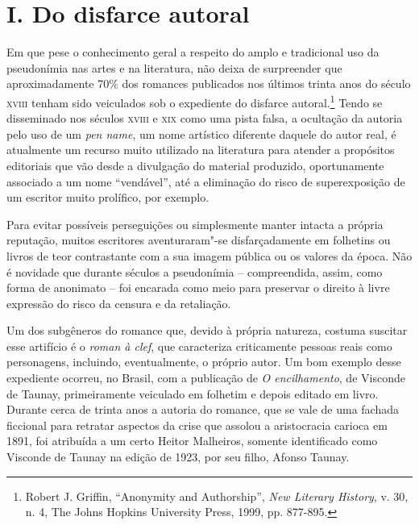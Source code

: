 

\section*{I. Do disfarce autoral}

Em que pese o conhecimento geral a respeito do amplo e tradicional uso
da pseudonímia nas artes e na literatura, não deixa de surpreender que
aproximadamente 70\% dos romances publicados nos últimos trinta anos do
século \textsc{xviii} tenham sido veiculados sob o expediente do
disfarce autoral.\footnote{Robert J. Griffin, ``Anonymity and
  Authorship'', \emph{New Literary History}, v. 30, n. 4, The Johns
  Hopkins University Press, 1999, pp. 877-895.} Tendo se disseminado nos
séculos \textsc{xviii} e \textsc{xix} como uma pista falsa, a ocultação
da autoria pelo uso de um \emph{pen name}, um nome artístico diferente
daquele do autor real, é atualmente um recurso muito utilizado na
literatura para atender a propósitos editoriais que vão desde a
divulgação do material produzido, oportunamente associado a um nome
``vendável'', até a eliminação do risco de superexposição de um escritor
muito prolífico, por exemplo.

Para evitar possíveis perseguições ou simplesmente manter intacta a
própria reputação, muitos escritores aventuraram"-se disfarçadamente em
folhetins ou livros de teor contrastante com a sua imagem pública ou os
valores da época. Não é novidade que durante séculos a pseudonímia --
compreendida, assim, como forma de anonimato -- foi encarada como meio
para preservar o direito à livre expressão do risco da censura e da
retaliação.

Um dos subgêneros do romance que, devido à própria natureza, costuma
suscitar esse artifício é o \emph{roman à clef}, que caracteriza
criticamente pessoas reais como personagens, incluindo, eventualmente, o
próprio autor. Um bom exemplo desse expediente ocorreu, no Brasil, com a
publicação de \emph{O encilhamento}, de Visconde de Taunay,
primeiramente veiculado em folhetim e depois editado em livro. Durante
cerca de trinta anos a autoria do romance, que se vale de uma fachada
ficcional para retratar aspectos da crise que assolou a aristocracia
carioca em 1891, foi atribuída a um certo Heitor Malheiros, somente
identificado como Visconde de Taunay na edição de 1923, por seu filho,
Afonso Taunay.

